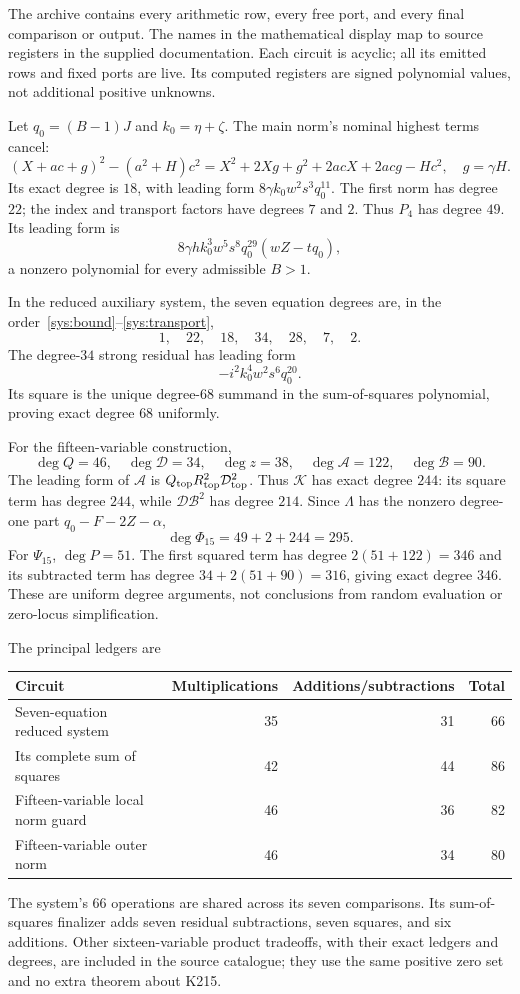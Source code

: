 \documentclass[11pt]{article}
\theoremstyle{remark}\newtheorem{remark}[theorem]{Remark}
\begin{document}
The archive contains every arithmetic row, every free port, and every final comparison or output. The names in the mathematical display map to source registers in the supplied documentation. Each circuit is acyclic; all its emitted rows and fixed ports are live. Its computed registers are signed polynomial values, not additional positive unknowns.

Let $q_0=(B-1)J$ and $k_0=\eta+\zeta$. The main norm's nominal highest terms cancel:
\[
 (X+ac+g)^2-(a^2+H)c^2
 =X^2+2Xg+g^2+2acX+2acg-Hc^2,\quad g=\gamma H.
\]
Its exact degree is $18$, with leading form $8\gamma k_0w^2s^3q_0^{11}$. The first norm has degree $22$; the index and transport factors have degrees $7$ and $2$. Thus $P_4$ has degree $49$. Its leading form is
\[
 8\gamma h k_0^3w^5s^8q_0^{29}(wZ-tq_0),
\]
a nonzero polynomial for every admissible $B>1$.

In the reduced auxiliary system, the seven equation degrees are, in the order~\eqref{sys:bound}--\eqref{sys:transport},
\[
 1,\quad22,\quad18,\quad34,\quad28,\quad7,\quad2.
\]
The degree-$34$ strong residual has leading form
\[
 -i^2k_0^4w^2s^6q_0^{20}.
\]
Its square is the unique degree-$68$ summand in the sum-of-squares polynomial, proving exact degree $68$ uniformly.

For the fifteen-variable construction,
\[
 \deg Q=46,\quad\deg\mathcal D=34,\quad\deg z=38,
 \quad\deg\mathcal A=122,\quad\deg\mathcal B=90.
\]
The leading form of $\mathcal A$ is $Q_{\rm top}R_{\rm top}^2\mathcal D_{\rm top}^2$. Thus $\mathcal K$ has exact degree $244$: its square term has degree $244$, while $\mathcal D\mathcal B^2$ has degree $214$. Since $\Lambda$ has the nonzero degree-one part $q_0-F-2Z-\alpha$,
\[
 \deg\Phi_{15}=49+2+244=295.
\]
For $\Psi_{15}$, $\deg P=51$. The first squared term has degree $2(51+122)=346$ and its subtracted term has degree $34+2(51+90)=316$, giving exact degree $346$. These are uniform degree arguments, not conclusions from random evaluation or zero-locus simplification.

The principal ledgers are
\begin{center}
\begin{tabular}{lrrr}
\toprule
Circuit & Multiplications & Additions/subtractions & Total\\
\midrule
Seven-equation reduced system &35&31&66\\
Its complete sum of squares &42&44&86\\
Fifteen-variable local norm guard &46&36&82\\
Fifteen-variable outer norm &46&34&80\\
\bottomrule
\end{tabular}
\end{center}
The system's $66$ operations are shared across its seven comparisons. Its sum-of-squares finalizer adds seven residual subtractions, seven squares, and six additions. Other sixteen-variable product tradeoffs, with their exact ledgers and degrees, are included in the source catalogue; they use the same positive zero set and no extra theorem about K215.
\end{document}
